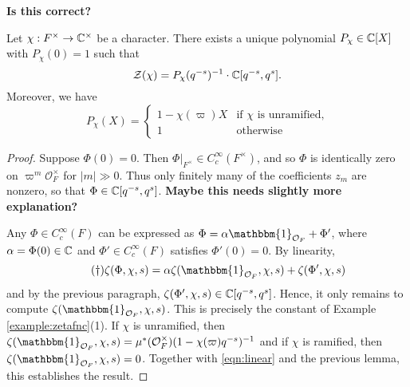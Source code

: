 \textbf{Is this correct?}
\fi

\begin{prop}\label{prop:gl1factor}
    Let $\chi:F^\times \to \mathbb{C}^\times$ be a character. There exists a unique polynomial $P_\chi \in \mathbb{C}[X]$ with $P_\chi(0)=1$ such that
    $$\mathcal Z(\chi) = P_\chi(q^{-s})^{-1}\cdot \mathbb{C}[q^{-s},q^s].$$
    Moreover, we have
    $$
    P_\chi(X) =
    \begin{cases}
        1-\chi(\varpi)X & \text{if $\chi$ is unramified,} \\
        1 & \text{otherwise}
    \end{cases}
    $$
\end{prop}
\begin{proof}
    Suppose $\Phi(0)=0$. Then $\Phi|_{F^\times} \in C_c^\infty(F^\times)$, and so $\Phi$ is identically zero on $\varpi^m\mathcal O_F^\times$ for $|m| \gg0$. Thus only finitely many of the coefficients $z_m$ are nonzero, so that $\Phi \in \mathbb{C}[q^{-s},q^s]$. \textbf{Maybe this needs slightly more explanation?}

    Any $\Phi\in C_c^\infty(F)$ can be expressed as $\Phi=\alpha\mathbbm{1}_{\mathcal{O}_F}+\Phi'$, where $\alpha=\Phi(0)\in\mathbb{C}$ and $\Phi'\in C_c^\infty(F)$ satisfies $\Phi'(0)=0$. By linearity,
    \begin{equation}\tag{\dag}\label{eqn:linear}
        \zeta(\Phi,\chi,s)=\alpha\zeta(\mathbbm{1}_{\mathcal{O}_F},\chi,s)+\zeta(\Phi',\chi,s)
    \end{equation}
    and by the previous paragraph, $\zeta(\Phi',\chi,s)\in\mathbb{C}[q^{-s},q^{s}]$. Hence, it only remains to compute $\zeta(\mathbbm{1}_{\mathcal O_F},\chi,s)$. This is precisely the constant of Example \ref{example:zetafnc}(1). If $\chi$ is unramified, then $\zeta(\mathbbm{1}_{\mathcal O_F},\chi,s)=\mu^*(\mathcal{O}_F^\times)(1-\chi(\varpi)q^{-s})^{-1}$ and if $\chi$ is ramified, then $\zeta(\mathbbm{1}_{\mathcal O_F},\chi,s)=0$. Together with \eqref{eqn:linear} and the previous lemma, this establishes the result. 
\end{proof}

\iffalse
\begin{rem}
    The computation in the proof above shows, in the case $\chi = 1$, that $\zeta(\mathbbm{1}_{\cO_F},1,s) = (1-q^{-s})^{-1}$, provided that $\mu^*(\mathcal{O}_F^\times)=1$. If $F=K_v$ is the completion of a number field $K$ at a non-Archimedean place $v$, we recover the Euler factor of the Dedekind zeta function $\zeta_K(s)$ at the place $v$. This explains the naming of our zeta functions. 
\end{rem}
\fi

